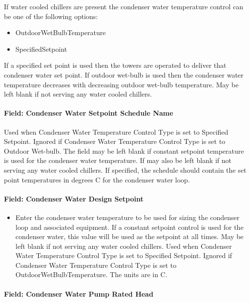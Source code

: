 If water cooled chillers are present the condenser water temperature control can be one of the following options:

\begin{itemize}
\item
  OutdoorWetBulbTemperature
\item
  SpecifiedSetpoint
\end{itemize}

If a specified set point is used then the towers are operated to deliver that condenser water set point. If outdoor wet-bulb is used then the condenser water temperature decreases with decreasing outdoor wet-bulb temperature. May be left blank if not serving any water cooled chillers.

\paragraph{Field: Condenser Water Setpoint Schedule Name}\label{field-condenser-water-setpoint-schedule-name}

Used when Condenser Water Temperature Control Type is set to Specified Setpoint. Ignored if Condenser Water Temperature Control Type is set to Outdoor Wet-bulb. The field may be left blank if constant setpoint temperature is used for the condenser water temperature. If may also be left blank if not serving any water cooled chillers. If specified, the schedule should contain the set point temperatures in degrees C for the condenser water loop.

\paragraph{Field: Condenser Water Design Setpoint}\label{field-condenser-water-design-setpoint}

\begin{itemize}
\tightlist
\item
  Enter the condenser water temperature to be used for sizing the condenser loop and associated equipment. If a constant setpoint control is used for the condenser water, this value will be used as the setpoint at all times. May be left blank if not serving any water cooled chillers. Used when Condenser Water Temperature Control Type is set to Specified Setpoint. Ignored if Condenser Water Temperature Control Type is set to OutdoorWetBulbTemperature. The units are in C.
\end{itemize}

\paragraph{Field: Condenser Water Pump Rated Head}\label{field-condenser-water-pump-rated-head}

